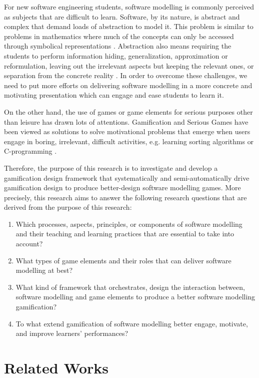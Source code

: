 \documentclass[runningheads,a4paper]{llncs}
\begin{document}
For new software engineering students, software modelling is commonly perceived as subjects that are difficult to learn. Software, by its nature, is abstract and complex that demand loads of abstraction to model it. This problem is similar to problems in mathematics where much of the concepts can only be accessed through symbolical representations \cite{Duval2006}. Abstraction also means requiring the students to perform information hiding, generalization, approximation or reformulation, leaving out the irrelevant aspects but keeping the relevant ones, or separation from the concrete reality \cite{Saitta2013}. In order to overcome these challenges, we need to put more efforts on delivering software modelling in a more concrete and motivating presentation which can engage and ease students to learn it.

On the other hand, the use of games or game elements for serious purposes other than leisure has drawn lots of attentions. Gamification \cite{deterding2011game} and Serious Games \cite{Michael2005} have been viewed as solutions to solve motivational problems that emerge when users engage in  boring, irrelevant, difficult activities, e.g. learning sorting algorithms \cite{Yohannis2015} or C-programming \cite{Ibanez2014}.

Therefore, the purpose of this research is to investigate and develop a gamification design framework that systematically and semi-automatically drive gamification design to produce better-design software modelling games. More precisely, this research aims to answer the following research questions that are derived from the purpose of this research:
\begin{enumerate}
\item Which processes, aspects, principles, or components of software modelling and their teaching and learning practices that are essential to take into account?
\item What types of game elements and their roles that can deliver software modelling at best? 
\item What kind of framework that orchestrates, design the interaction between, software modelling and game elements to produce a better software modelling gamification?
\item To what extend gamification of software modelling better engage, motivate, and improve learners’ performances?
\end{enumerate}

\section{Related Works}
\end{document}
